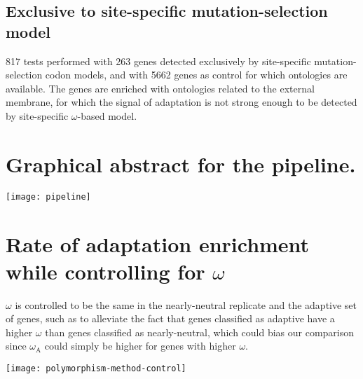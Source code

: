 \documentclass{article}
\renewcommand*{\bm}[1]{#1}%
\begin{document}
    \begin{center}
        \small
        
    \end{center}

    \subsection{Exclusive to site-specific mutation-selection model}
    \label{subsec:exclusive-to-mutation-selection-codon-method}

    817 tests performed with 263 genes detected exclusively by site-specific mutation-selection codon models, and with 5662 genes as control for which ontologies are available.
    The genes are enriched with ontologies related to the external membrane, for which the signal of adaptation is not strong enough to be detected by site-specific $\omega$-based model.

    \begin{center}
        \small
        
    \end{center}

    \pagebreak


    \section{Graphical abstract for the pipeline.}
    \label{subsec:method-summary}

    \begin{center}
        \texttt{[image: pipeline]}
    \end{center}

    \pagebreak


    \section{Rate of adaptation enrichment while controlling for $\bm{\omega}$}
    \label{sec:controlling-for-omega}

    $\omega$ is controlled to be the same in the nearly-neutral replicate and the adaptive set of genes, such as to alleviate the fact that genes classified as adaptive have a higher $\omega$ than genes classified as nearly-neutral, which could bias our comparison since $\omega_{\mathrm{A}}$ could simply be higher for genes with higher $\omega$.

    \begin{center}
        \texttt{[image: polymorphism-method-control]}
    \end{center}
\end{document}
